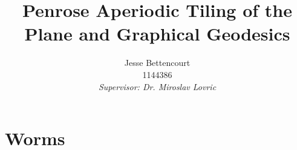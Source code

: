\documentclass[
  oneside,
  11pt, a4paper,
  footinclude=true,
  headinclude=true,
  cleardoublepage=empty
]{scrbook}
\title{Penrose Aperiodic Tiling of the Plane and Graphical Geodesics}
\author{Jesse Bettencourt\\1144386\\[80pt]  \textit{Supervisor: Dr. Miroslav Lovric}}
\begin{document}
\section{Worms} 
\end{document}
